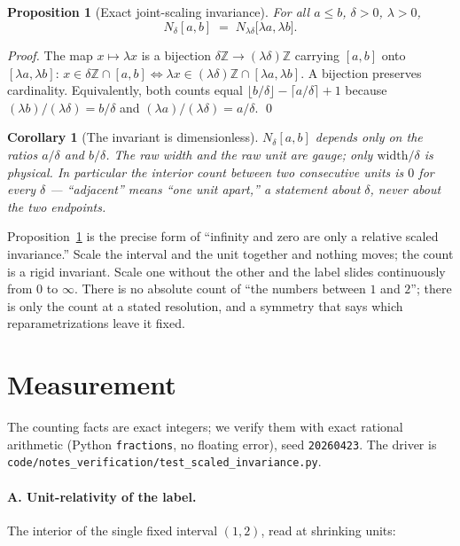 \documentclass[11pt]{article}
\theoremstyle{definition}
\theoremstyle{plain}
\newtheorem{proposition}{Proposition}
\newtheorem{corollary}{Corollary}
\newcommand{\Z}{\mathbb{Z}}
\begin{document}
\begin{proposition}[Exact joint-scaling invariance]\label{prop:invariance}
For all $a\le b$, $\delta>0$, $\lambda>0$,
\[
  N_\delta[a,b]\;=\;N_{\lambda\delta}\big[\lambda a,\lambda b\big].
\]
\end{proposition}
\begin{proof}
The map $x\mapsto\lambda x$ is a bijection $\delta\Z\to(\lambda\delta)\Z$ carrying $[a,b]$ onto
$[\lambda a,\lambda b]$: $x\in\delta\Z\cap[a,b]\iff \lambda x\in(\lambda\delta)\Z\cap[\lambda a,\lambda b]$.
A bijection preserves cardinality. Equivalently, both counts equal
$\lfloor b/\delta\rfloor-\lceil a/\delta\rceil+1$ because $(\lambda b)/(\lambda\delta)=b/\delta$ and
$(\lambda a)/(\lambda\delta)=a/\delta$. \qed
\end{proof}

\begin{corollary}[The invariant is dimensionless]\label{cor:dimless}
$N_\delta[a,b]$ depends only on the ratios $a/\delta$ and $b/\delta$. The raw width and the raw unit
are gauge; only $\mathrm{width}/\delta$ is physical. In particular the interior count between two
consecutive units is $0$ for \emph{every} $\delta$ --- ``adjacent'' means ``one unit apart,'' a
statement about $\delta$, never about the two endpoints.
\end{corollary}

Proposition~\ref{prop:invariance} is the precise form of ``infinity and zero are only a relative
scaled invariance.'' Scale the interval and the unit together and nothing moves; the count is a rigid
invariant. Scale one without the other and the label slides continuously from $0$ to $\infty$. There
is no absolute count of ``the numbers between $1$ and $2$''; there is only the count at a stated
resolution, and a symmetry that says which reparametrizations leave it fixed.

\section{Measurement}\label{sec:meas}

The counting facts are exact integers; we verify them with exact rational arithmetic (Python
\texttt{fractions}, no floating error), seed \texttt{20260423}. The driver is
\nolinkurl{code/notes_verification/test_scaled_invariance.py}.

\paragraph{A. Unit-relativity of the label.} The interior of the single fixed interval $(1,2)$, read
at shrinking units:
\end{document}
